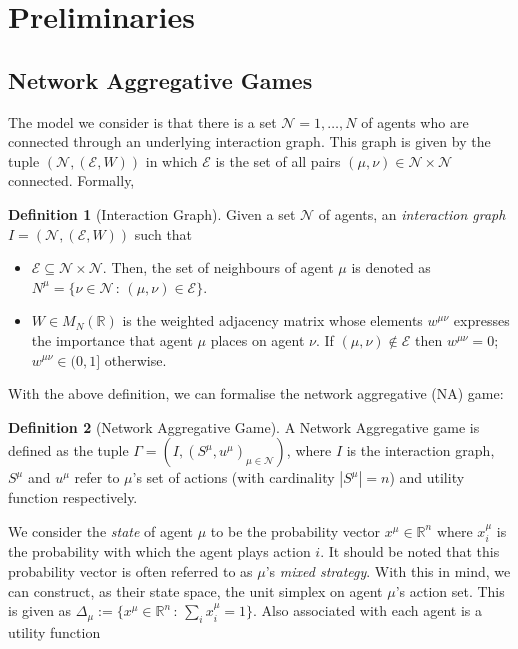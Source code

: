 \documentclass{article}
\theoremstyle{definition}
\newtheorem*{definition}{Definition}
\newcommand{\agentset}{\mathcal{N}}
\newcommand{\edgeset}{\mathcal{E}}
\newcommand{\weightset}{W}
\newcommand{\actionset}[1]{S^{#1}}
\newcommand{\utility}[1]{u^{#1}}
\newcommand{\wmunu}{w^{\mu \nu}}
\newcommand{\xmu}{x^{\mu}}
\newcommand{\xmuaction}[1]{x^{\mu}_{#1}}
\begin{document}
\section{Preliminaries}
\subsection{Network Aggregative Games}
\label{sec::NAG}

  The model we consider is that there is a set $\agentset = {1,
           \ldots , N}$ of agents who are connected through an underlying
          interaction graph. This graph is given by the tuple
          $(\agentset, (\edgeset, \weightset))$ in which $\edgeset$ is
          the set of all pairs $(\mu, \nu) \in \agentset \times \agentset$
          connected. Formally,
        
  \begin{definition}[Interaction Graph]
    Given a set $\agentset$ of agents, an {\em interaction graph} $I = (\agentset, (\edgeset,
    \weightset))$ such that
    \begin{itemize}
    \item $\edgeset \subseteq \agentset \times \agentset$.        Then, the set of neighbours of agent
        $\mu$ is denoted as $N^\mu = \{\nu \in \agentset \, : \, (\mu, \nu) \in \edgeset\}$.
      \item $\weightset \in M_N(\mathbb{R})$ is the weighted adjacency matrix whose elements $w^{\mu
        \nu}$ expresses the importance that agent $\mu$ places on agent $\nu$. If $(\mu, \nu) \not
        \in \edgeset$ then $w^{\mu \nu} = 0$;        $\wmunu \in (0, 1]$ otherwise.
    \end{itemize}
  \end{definition}

  With the above definition, we can formalise the network aggregative (NA) game:

  \begin{definition}[Network Aggregative Game]
    A Network Aggregative game is defined as the tuple $\Gamma = (I, (\actionset{\mu},
        \utility{\mu})_{\mu \in \mathcal{N}})$, where $I$ is the interaction graph,
        $\actionset{\mu}$ and $\utility{\mu}$ refer to $\mu$'s set of actions (with cardinality
        $|\actionset{\mu}| = n$) and utility function respectively.
  \end{definition}

  We consider the \emph{state} of agent $\mu$ to be the probability vector $\xmu \in
  \mathbb{R}^n$ where $\xmu_i$ is the probability with which the agent plays action $i$. It
  should be noted that this probability vector is often referred to as $\mu$'s \emph{mixed
  strategy}. With this in mind, we can construct, as their state space, the unit simplex on
  agent $\mu$'s action set. This is given as $\Delta_\mu := \{\xmu \in \mathbb{R}^n \, : \,
  \sum_i \xmuaction{i} = 1\}$. Also associated with each agent is a utility function
\end{document}

